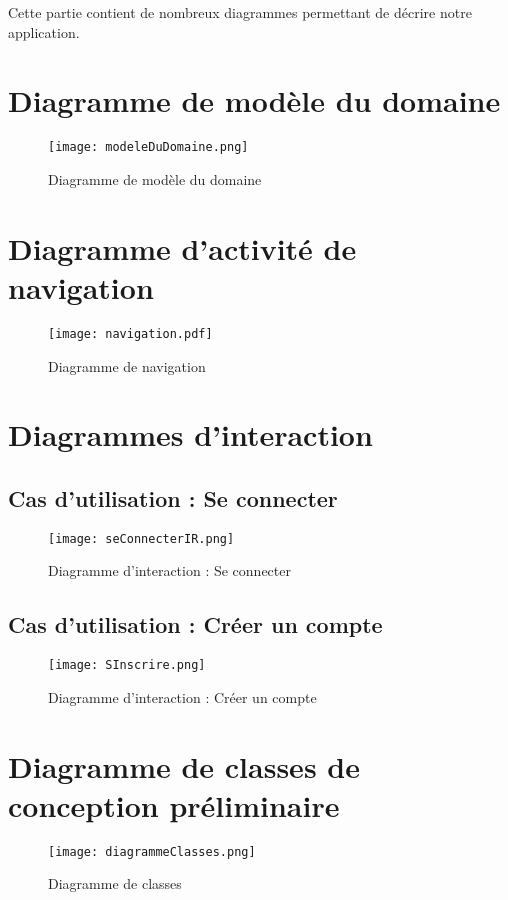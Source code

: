 Cette partie contient de nombreux diagrammes permettant de décrire notre application.
\section{Diagramme de modèle du domaine}
\begin{figure}[h!]
\begin{center}
   \caption{Diagramme de modèle du domaine}
   \texttt{[image: modeleDuDomaine.png]}
   \end{center}
\end{figure}
\newpage
\section{Diagramme d'activité de navigation}
\begin{figure}[h!]
\begin{center}
   \caption{Diagramme de navigation}
   \texttt{[image: navigation.pdf]}
   \end{center}
\end{figure}
\newpage
\section{Diagrammes d'interaction}
\subsection{Cas d'utilisation : Se connecter}
\begin{figure}[h!]
\begin{center}
   \caption{Diagramme d'interaction : Se connecter}
   \texttt{[image: seConnecterIR.png]}
   \end{center}
\end{figure}
\subsection{Cas d'utilisation : Créer un compte}
\begin{figure}[h!]
\begin{center}
   \caption{Diagramme d'interaction : Créer un compte}
   \texttt{[image: SInscrire.png]}
   \end{center}
\end{figure}
\newpage
\section{Diagramme de classes de conception préliminaire}
\begin{figure}[h!]
\begin{center}
   \caption{Diagramme de classes}
   \texttt{[image: diagrammeClasses.png]}
   \end{center}
\end{figure}